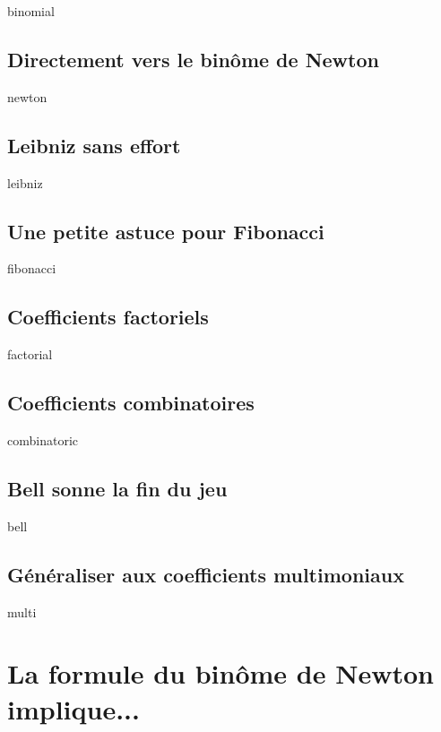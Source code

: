 \documentclass[12pt]{amsart}
\begin{document}
    {binomial}
    
    
    \subsection{Directement vers le binôme de Newton}
    
    {newton}
    
    
    \subsection{Leibniz sans effort}
    
    {leibniz}
    
    
    \subsection{Une petite astuce pour Fibonacci}
    
    {fibonacci}
    
    
    \subsection{Coefficients factoriels}
    
    {factorial}
    
    
    \subsection{Coefficients combinatoires}
    
    {combinatoric}
    
    
    \subsection{Bell sonne la fin du jeu}
    
    {bell}
    
    
\subsection{Généraliser aux coefficients multimoniaux}

{multi}




\section{La formule du binôme de Newton implique...}
\end{document}
